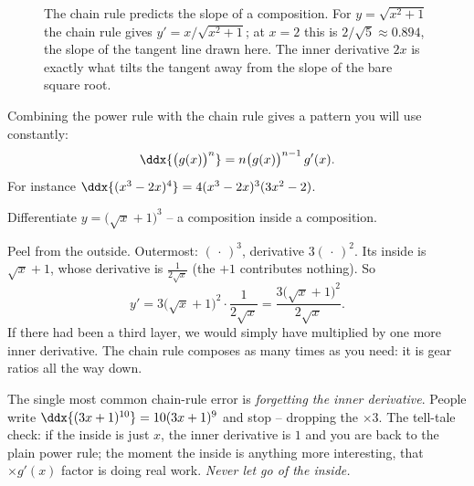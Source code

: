 \begin{figure}[H]
\centering
{}
\caption{The chain rule predicts the slope of a composition. For
$y=\sqrt{x^2+1}$ the chain rule gives $y'=x/\sqrt{x^2+1}$; at $x=2$ this is
$2/\sqrt5\approx 0.894$, the slope of the tangent line drawn here. The inner
derivative $2x$ is exactly what tilts the tangent away from the slope of the
bare square root.}
\label{ch11:fig-chain-graph}
\end{figure}

\begin{example}\label{ch11:ex-chain-genpow}
Combining the power rule with the chain rule gives a pattern you will use constantly:
\[
  \ddx{\big(g(x)\big)^n} = n\big(g(x)\big)^{n-1}\,g'(x).
\]
For instance $\ddx{(x^3 - 2x)^4} = 4(x^3-2x)^3(3x^2-2)$.
\end{example}

\begin{example}\label{ch11:ex-chain3}
Differentiate $y = \big(\sqrt{x}+1\big)^{3}$ -- a composition inside a composition.

Peel from the outside. Outermost: $(\,\cdot\,)^3$, derivative $3(\,\cdot\,)^2$. Its inside
is $\sqrt{x}+1$, whose derivative is $\tfrac{1}{2\sqrt{x}}$ (the $+1$ contributes nothing).
So
\[
  y' = 3\big(\sqrt{x}+1\big)^{2}\cdot\frac{1}{2\sqrt{x}}
     = \frac{3\big(\sqrt{x}+1\big)^{2}}{2\sqrt{x}} .
\]
If there had been a third layer, we would simply have multiplied by one more inner
derivative. The chain rule composes as many times as you need: it is gear ratios all the
way down.
\end{example}

\begin{trapbox}
The single most common chain-rule error is \emph{forgetting the inner derivative}. People
write $\ddx{(3x+1)^{10}} = 10(3x+1)^9$ and stop -- dropping the $\times 3$. The tell-tale
check: if the inside is just $x$, the inner derivative is $1$ and you are back to the
plain power rule; the moment the inside is anything more interesting, that $\times g'(x)$
factor is doing real work. \emph{Never let go of the inside.}
\end{trapbox}


